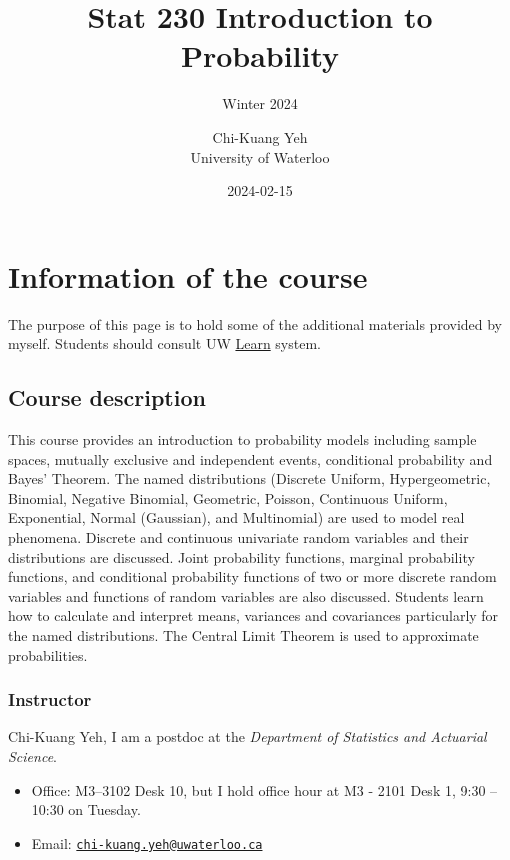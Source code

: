 \documentclass[
]{book}
\title{Stat 230 Introduction to Probability}
\subtitle{Winter 2024}
\author{Chi-Kuang Yeh\\
University of Waterloo}
\date{2024-02-15}
\providecommand{\tightlist}{%
  \setlength{\itemsep}{0pt}\setlength{\parskip}{0pt}}
\theoremstyle{definition}
\theoremstyle{definition}
\theoremstyle{definition}
\theoremstyle{definition}
\theoremstyle{remark}
\begin{document}
\maketitle

{
\setcounter{tocdepth}{1}
\tableofcontents
}
\hypertarget{information-of-the-course}{%
\chapter{Information of the course}\label{information-of-the-course}}

The purpose of this page is to hold some of the additional materials provided by myself. Students should consult UW \href{https://api-4ccc589b.duosecurity.com/frame/v4/preauth/healthcheck?sid=frameless-c0657e9d-cb86-4ac9-a6a7-fd054ae21fd5}{Learn} system.

\hypertarget{course-description}{%
\section{Course description}\label{course-description}}

This course provides an introduction to probability models including sample spaces, mutually exclusive and independent events, conditional probability and Bayes' Theorem. The named distributions (Discrete Uniform, Hypergeometric, Binomial, Negative Binomial, Geometric, Poisson, Continuous Uniform, Exponential, Normal (Gaussian), and Multinomial) are used to model real phenomena. Discrete and continuous univariate random variables and their distributions are discussed. Joint probability functions, marginal probability functions, and conditional probability functions of two or more discrete random variables and functions of random variables are also discussed. Students learn how to calculate and interpret means, variances and covariances particularly for the named distributions. The Central Limit Theorem is used to approximate probabilities.

\hypertarget{instructor}{%
\subsection{Instructor}\label{instructor}}

Chi-Kuang Yeh, I am a postdoc at the \emph{Department of Statistics and Actuarial Science}.

\begin{itemize}
\tightlist
\item
  Office: M3--3102 Desk 10, but I hold office hour at M3 - 2101 Desk 1, 9:30 -- 10:30 on Tuesday.
\item
  Email: \href{mailto:chi-kuang.yeh@uwaterloo.ca}{\nolinkurl{chi-kuang.yeh@uwaterloo.ca}}
\end{itemize}
\end{document}
